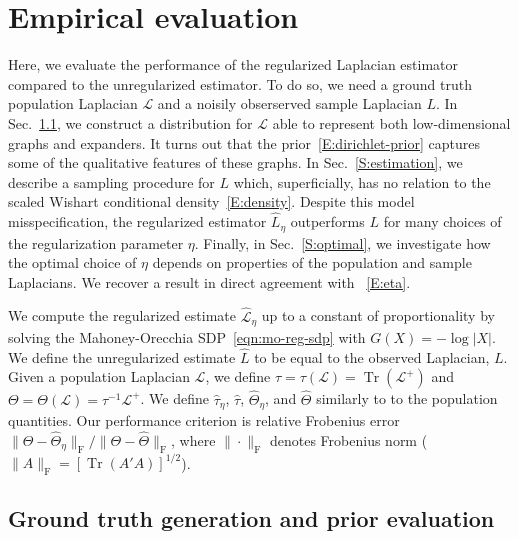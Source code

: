 \documentclass[12pt]{article}
\DeclareMathOperator*{\Tr}{Tr}
\theoremstyle{plain}
\begin{document}
\section{Empirical evaluation}
\label{sxn:empirical}

Here, we evaluate the performance of the regularized Laplacian
estimator compared to the unregularized estimator.  To do so, we need
a ground truth population Laplacian $\mathcal{L}$ and a noisily
obserserved sample Laplacian $L$. In Sec.~\ref{S:prior-evaluation}, we
construct a distribution for $\mathcal{L}$ able to represent both
low-dimensional graphs and expanders.  It turns out that the
prior~\eqref{E:dirichlet-prior} captures some of the qualitative
features of these graphs.  In Sec.~\ref{S:estimation}, we describe a
sampling procedure for $L$ which, superficially, has no relation to
the scaled Wishart conditional density~\eqref{E:density}.  Despite
this model misspecification, the regularized estimator $\hat L_{\eta}$
outperforms $L$ for many choices of the regularization parameter
$\eta$.  Finally, in Sec.~\ref{S:optimal}, we investigate how the
optimal choice of $\eta$ depends on properties of the population and
sample Laplacians.  We recover a result in direct agreement with
~\eqref{E:eta}.

We compute the regularized estimate $\mathcal{\hat L}_\eta$ up to a
constant of proportionality by solving the Mahoney-Orecchia
SDP~\eqref{eqn:mo-reg-sdp} with $G(X) = -\log|X|$.  We define the
unregularized estimate $\hat L$ to be equal to the observed Laplacian,
$L$.  Given a population Laplacian $\mathcal{L}$, we define
$\tau = \tau(\mathcal{L}) = \Tr(\mathcal{L}^+)$ and
$\Theta = \Theta(\mathcal{L}) = \tau^{-1} \mathcal{L}^+$. We define
$\hat \tau_\eta$, $\hat \tau$, $\hat \Theta_\eta$, and $\hat \Theta$
similarly to to the population quantities.  Our performance
criterion is relative Frobenius error
$\|\Theta - \hat \Theta_\eta\|_\mathrm{F} / \|\Theta - \hat \Theta
\|_\mathrm{F}$, where $\|\cdot\|_\mathrm{F}$ denotes Frobenius norm
($\|A\|_\mathrm{F} = [\Tr(A' A)]^{1/2}$).


\subsection{Ground truth generation and prior evaluation}\label{S:prior-evaluation}
\end{document}
